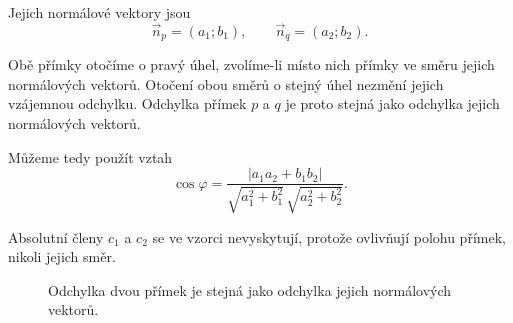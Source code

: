 Jejich normálové vektory jsou
\[
    \vec{n}_p=(a_1;b_1),
    \qquad
    \vec{n}_q=(a_2;b_2).
\]

Obě přímky otočíme o pravý úhel, zvolíme-li místo nich přímky ve
směru jejich normálových vektorů. Otočení obou směrů o stejný úhel
nezmění jejich vzájemnou odchylku. Odchylka přímek $p$ a $q$ je proto
stejná jako odchylka jejich normálových vektorů.

Můžeme tedy použít vztah
\begin{equation}\label{eq:Angle_general_lines}
    \cos\varphi
    =
    \frac{
        |a_1a_2+b_1b_2|
    }
    {
        \sqrt{a_1^2+b_1^2}\,
        \sqrt{a_2^2+b_2^2}
    }.
\end{equation}

Absolutní členy $c_1$ a $c_2$ se ve vzorci nevyskytují, protože
ovlivňují polohu přímek, nikoli jejich směr.

\begin{figure}[H]
    \centering
    \caption{Odchylka dvou přímek je stejná jako odchylka jejich
    normálových vektorů.}
    \label{fig:Angle_general_lines_normals}
\end{figure}

